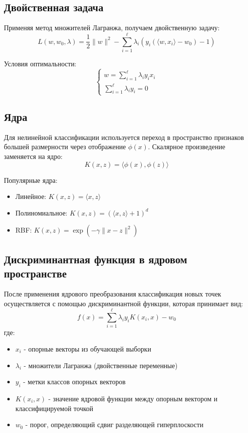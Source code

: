 \subsection{Двойственная задача}
\par Применяя метод множителей Лагранжа, получаем двойственную задачу:
\begin{equation*}
    L(w,w_0,\lambda) = \frac{1}{2}\|w\|^2 - \sum_{i=1}^{\ell} \lambda_i(y_i(\langle w,x_i \rangle - w_0) - 1)
\end{equation*}
\par Условия оптимальности:
\begin{equation*}
    \begin{cases}
        w = \sum_{i=1}^{\ell} \lambda_i y_i x_i \\
        \sum_{i=1}^{\ell} \lambda_i y_i = 0
    \end{cases}
\end{equation*}

\subsection{Ядра}
\par Для нелинейной классификации используется переход в пространство признаков большей размерности через отображение \( \phi(x) \). Скалярное произведение заменяется на ядро:
\begin{equation*}
    K(x,z) = \langle \phi(x),\phi(z) \rangle
\end{equation*}
\par Популярные ядра:
\begin{itemize}
    \item Линейное: \( K(x,z) = \langle x,z \rangle \)
    \item Полиномиальное: \( K(x,z) = (\langle x,z \rangle + 1)^d \)
    \item RBF: \( K(x,z) = \exp(-\gamma\|x-z\|^2) \)
\end{itemize}

\subsection{Дискриминантная функция в ядровом пространстве}
\par После применения ядрового преобразования классификация новых точек осуществляется с помощью дискриминантной функции, которая принимает вид:
\begin{equation*}
    f(x) = \sum_{i=1}^{\ell} \lambda_i y_i K(x_i,x) - w_0
\end{equation*}
где:
\begin{itemize}
    \item \(x_i\) - опорные векторы из обучающей выборки
    \item \(\lambda_i\) - множители Лагранжа (двойственные переменные)
    \item \(y_i\) - метки классов опорных векторов
    \item \(K(x_i,x)\) - значение ядровой функции между опорным вектором и классифицируемой точкой
    \item \(w_0\) - порог, определяющий сдвиг разделяющей гиперплоскости
\end{itemize}

